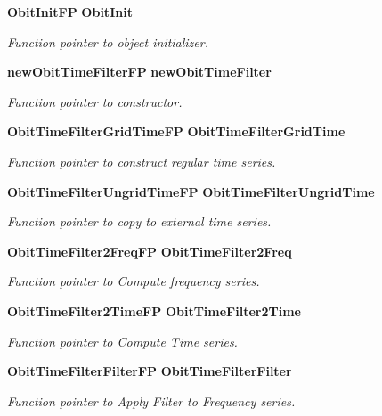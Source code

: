 \begin{CompactItemize}
{\bf Obit\-Init\-FP} {\bf Obit\-Init}
\begin{CompactList}\small\item\em Function pointer to object initializer. \item\end{CompactList}\item 
{\bf new\-Obit\-Time\-Filter\-FP} {\bf new\-Obit\-Time\-Filter}
\begin{CompactList}\small\item\em Function pointer to constructor. \item\end{CompactList}\item 
{\bf Obit\-Time\-Filter\-Grid\-Time\-FP} {\bf Obit\-Time\-Filter\-Grid\-Time}
\begin{CompactList}\small\item\em Function pointer to construct regular time series. \item\end{CompactList}\item 
{\bf Obit\-Time\-Filter\-Ungrid\-Time\-FP} {\bf Obit\-Time\-Filter\-Ungrid\-Time}
\begin{CompactList}\small\item\em Function pointer to copy to external time series. \item\end{CompactList}\item 
{\bf Obit\-Time\-Filter2Freq\-FP} {\bf Obit\-Time\-Filter2Freq}
\begin{CompactList}\small\item\em Function pointer to Compute frequency series. \item\end{CompactList}\item 
{\bf Obit\-Time\-Filter2Time\-FP} {\bf Obit\-Time\-Filter2Time}
\begin{CompactList}\small\item\em Function pointer to Compute Time series. \item\end{CompactList}\item 
{\bf Obit\-Time\-Filter\-Filter\-FP} {\bf Obit\-Time\-Filter\-Filter}
\begin{CompactList}\small\item\em Function pointer to Apply Filter to Frequency series. \item\end{CompactList}\item 

\end{CompactItemize}

